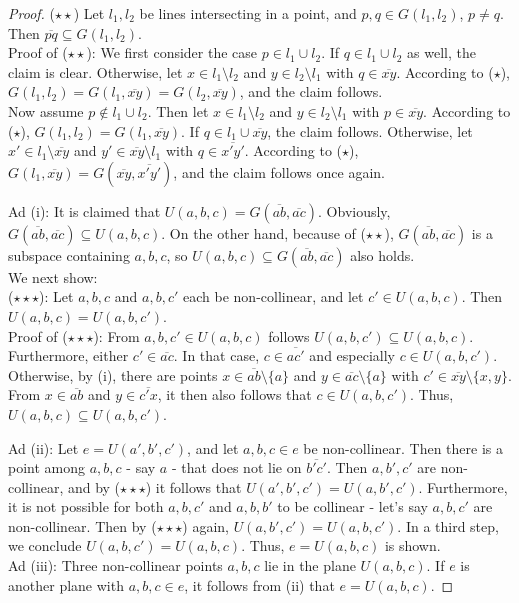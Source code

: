 \documentclass[11pt,a4paper]{article}
\newcommand{\lineab}[1]{\overline{#1}}
\begin{document}
\begin{proof}
($\star\star$) Let $l_1, l_2$ be lines intersecting in a point, and $p, q \in G(l_1, l_2)$, $p \neq q$. Then $\lineab{pq} \subseteq G(l_1, l_2)$. \\
Proof of ($\star\star$): We first consider the case $p \in l_1 \cup l_2$. If $q \in l_1 \cup l_2$ as well, the claim is clear. Otherwise, let $x \in l_1 \setminus l_2$ and $y \in l_2 \setminus l_1$ with $q \in \lineab{xy}$. According to ($\star$), $G(l_1, l_2) = G(l_1, \lineab{xy}) = G(l_2, \lineab{xy})$, and the claim follows. \\
Now assume $p \notin l_1 \cup l_2$. Then let $x \in l_1 \setminus l_2$ and $y \in l_2 \setminus l_1$ with $p \in \lineab{xy}$. According to ($\star$), $G(l_1, l_2) = G(l_1, \lineab{xy})$. If $q \in l_1 \cup \lineab{xy}$, the claim follows. Otherwise, let $x' \in l_1 \setminus \lineab{xy}$ and $y' \in \lineab{xy} \setminus l_1$ with $q \in \lineab{x'y'}$. According to ($\star$), $G(l_1, \lineab{xy}) = G(\lineab{xy}, \lineab{x'y'})$, and the claim follows once again.

Ad (i): It is claimed that $U(a, b, c) = G(\lineab{ab}, \lineab{ac})$. Obviously, $G(\lineab{ab}, \lineab{ac}) \subseteq U(a, b, c)$. On the other hand, because of ($\star\star$), $G(\lineab{ab}, \lineab{ac})$ is a subspace containing $a, b, c$, so $U(a, b, c) \subseteq G(\lineab{ab}, \lineab{ac})$ also holds. \\
We next show: \\
($\star\star\star$): Let $a, b, c$ and $a, b, c'$ each be non-collinear, and let $c' \in U(a, b, c)$. Then $U(a, b, c) = U(a, b, c')$. \\
Proof of ($\star\star\star$): From $a, b, c' \in U(a, b, c)$ follows $U(a, b, c') \subseteq U(a, b, c)$. Furthermore, either $c' \in \lineab{ac}$. In that case, $c \in \lineab{ac'}$ and especially $c \in U(a, b, c')$. Otherwise, by (i), there are points $x \in \lineab{ab} \setminus \{a\}$ and $y \in \lineab{ac} \setminus \{a\}$ with $c' \in \lineab{xy} \setminus \{x, y\}$. From $x \in \lineab{ab}$ and $y \in \lineab{c'x}$, it then also follows that $c \in U(a, b, c')$. Thus, $U(a, b, c) \subseteq U(a, b, c')$.

Ad (ii): Let $e = U(a', b', c')$, and let $a, b, c \in e$ be non-collinear. Then there is a point among $a, b, c$ - say $a$ - that does not lie on $\lineab{b'c'}$. Then $a, b', c'$ are non-collinear, and by ($\star\star\star$) it follows that $U(a', b', c') = U(a, b', c')$. Furthermore, it is not possible for both $a, b, c'$ and $a, b, b'$ to be collinear - let's say $a, b, c'$ are non-collinear. Then by ($\star\star\star$) again, $U(a, b', c') = U(a, b, c')$. In a third step, we conclude $U(a, b, c') = U(a, b, c)$. Thus, $e = U(a, b, c)$ is shown. \\
Ad (iii): Three non-collinear points $a, b, c$ lie in the plane $U(a, b, c)$. If $e$ is another plane with $a, b, c \in e$, it follows from (ii) that $e = U(a, b, c)$.
\end{proof}
\end{document}
